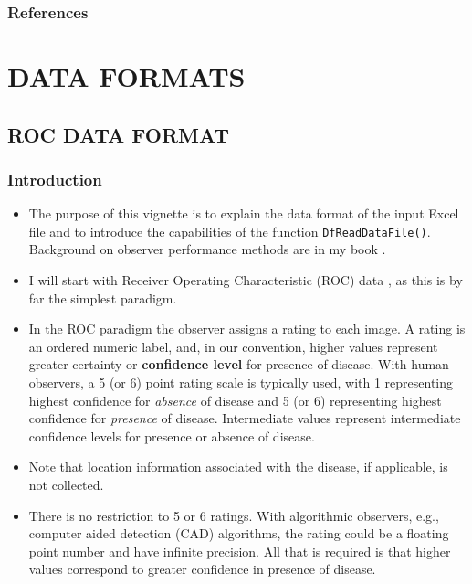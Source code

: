 \documentclass[]{book}
\providecommand{\tightlist}{%
  \setlength{\itemsep}{0pt}\setlength{\parskip}{0pt}}
\begin{document}
\hypertarget{references}{%
\section{References}\label{references}}

\hypertarget{part-data-formats}{%
\part*{DATA FORMATS}\label{part-data-formats}}

\hypertarget{rocdataformat}{%
\chapter{ROC DATA FORMAT}\label{rocdataformat}}

\hypertarget{introduction}{%
\section{Introduction}\label{introduction}}

\begin{itemize}
\tightlist
\item
  The purpose of this vignette is to explain the data format of the input Excel file and to introduce the capabilities of the function \texttt{DfReadDataFile()}. Background on observer performance methods are in my book \citep{RN2680}.
\item
  I will start with Receiver Operating Characteristic (ROC) data \citep{RN1766}, as this is by far the simplest paradigm.
\item
  In the ROC paradigm the observer assigns a rating to each image. A rating is an ordered numeric label, and, in our convention, higher values represent greater certainty or \textbf{confidence level} for presence of disease. With human observers, a 5 (or 6) point rating scale is typically used, with 1 representing highest confidence for \emph{absence} of disease and 5 (or 6) representing highest confidence for \emph{presence} of disease. Intermediate values represent intermediate confidence levels for presence or absence of disease.
\item
  Note that location information associated with the disease, if applicable, is not collected.
\item
  There is no restriction to 5 or 6 ratings. With algorithmic observers, e.g., computer aided detection (CAD) algorithms, the rating could be a floating point number and have infinite precision. All that is required is that higher values correspond to greater confidence in presence of disease.
\end{itemize}
\end{document}

